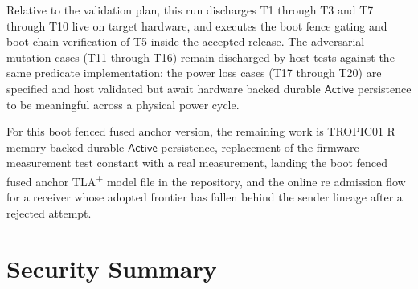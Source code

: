 \documentclass[11pt]{article}
\theoremstyle{definition}
\theoremstyle{remark}
\newcommand{\Active}{\ensuremath{\mathsf{Active}}}
\begin{document}
Relative to the validation plan, this run discharges T1 through T3 and T7 through T10 live on
target hardware, and executes the boot fence gating and boot chain verification of T5 inside the
accepted release. The adversarial mutation cases (T11 through T16) remain discharged by host
tests against the same predicate implementation; the power loss cases (T17 through T20) are
specified and host validated but await hardware backed durable \(\Active\) persistence to be
meaningful across a physical power cycle.

For this boot fenced fused anchor version, the remaining work is TROPIC01 R memory backed durable
\(\Active\) persistence, replacement of the firmware measurement test constant with a real
measurement, landing the boot fenced fused anchor TLA\texorpdfstring{\textsuperscript{+}}{+}
model file in the repository, and the online re admission flow for a receiver whose adopted
frontier has fallen behind the sender lineage after a rejected attempt.

\section{Security Summary}
\end{document}
